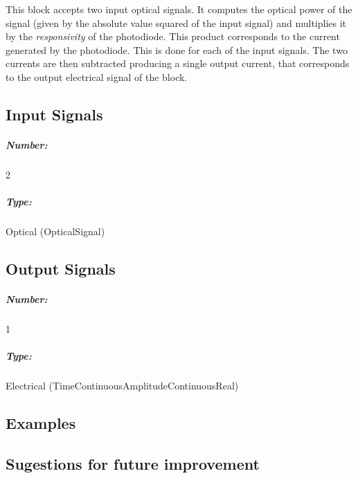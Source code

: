 \documentclass[a4paper]{article}
\begin{document}
This block accepts two input optical signals. It computes the optical power of the signal (given by the absolute value squared of the input signal) and multiplies it by the \textit{responsivity} of the photodiode. This product corresponds to the current generated by the photodiode. This is done for each of the input signals. The two currents are then subtracted producing a single output current, that corresponds to the output electrical signal of the block.

\pagebreak

\subsection*{Input Signals}

\subparagraph*{Number:} 2

\subparagraph*{Type:} Optical (OpticalSignal)

\subsection*{Output Signals}

\subparagraph*{Number:} 1

\subparagraph*{Type:} Electrical (TimeContinuousAmplitudeContinuousReal)

\subsection*{Examples} 

\subsection*{Sugestions for future improvement}
\end{document}
